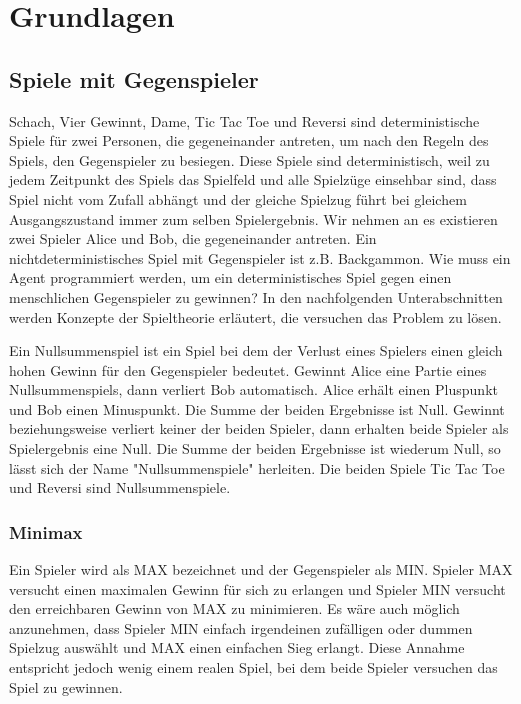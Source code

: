 \chapter{Grundlagen}
\label{ch:Grundlagen}


\section{Spiele mit Gegenspieler}
Schach, Vier Gewinnt, Dame, Tic Tac Toe und Reversi sind deterministische Spiele für zwei Personen, die gegeneinander antreten, um nach den Regeln des Spiels, den Gegenspieler zu besiegen. Diese Spiele sind deterministisch, weil zu jedem Zeitpunkt des Spiels das Spielfeld und alle Spielzüge einsehbar sind, dass Spiel nicht vom Zufall abhängt und der gleiche Spielzug führt bei gleichem Ausgangszustand immer zum selben Spielergebnis. Wir nehmen an es existieren zwei Spieler Alice und Bob, die gegeneinander antreten. Ein nichtdeterministisches Spiel mit Gegenspieler ist z.B. Backgammon. Wie muss ein Agent programmiert werden, um ein deterministisches Spiel gegen einen menschlichen Gegenspieler zu gewinnen? In den nachfolgenden Unterabschnitten werden Konzepte der Spieltheorie erläutert, die versuchen das Problem zu lösen.

Ein Nullsummenspiel ist ein Spiel bei dem der Verlust eines Spielers einen gleich hohen Gewinn für den Gegenspieler bedeutet. Gewinnt Alice eine Partie eines Nullsummenspiels, dann verliert Bob automatisch. Alice erhält einen Pluspunkt und Bob einen Minuspunkt. Die Summe der beiden Ergebnisse ist Null. Gewinnt beziehungsweise verliert keiner der beiden Spieler, dann erhalten beide Spieler als Spielergebnis eine Null. Die Summe der beiden Ergebnisse ist wiederum Null, so lässt sich der Name "Nullsummenspiele" herleiten. Die beiden Spiele Tic Tac Toe und Reversi sind Nullsummenspiele. 

\subsection{Minimax}
Ein Spieler wird als MAX bezeichnet und der Gegenspieler als MIN. Spieler MAX versucht einen maximalen Gewinn für sich zu erlangen und Spieler MIN versucht den erreichbaren Gewinn von MAX zu minimieren. Es wäre auch möglich anzunehmen, dass Spieler MIN einfach irgendeinen zufälligen oder dummen Spielzug auswählt und MAX einen einfachen Sieg erlangt. Diese Annahme entspricht jedoch wenig einem realen Spiel, bei dem beide Spieler versuchen das Spiel zu gewinnen.\\


